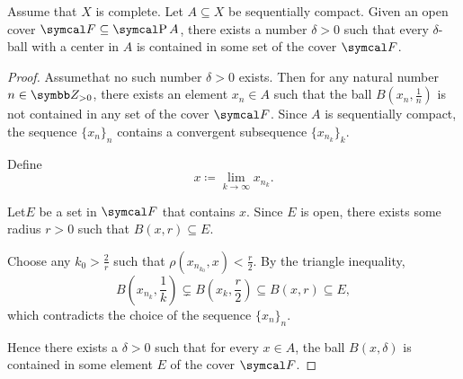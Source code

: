 \begin{lemma}\label{thm:lebesgue_covering_lemma}
  Assume that \( X \) is complete. Let \( A \subseteq X \) be sequentially compact. Given an open cover \( \Cal{F} \subseteq \Power A \), there exists a number \( \delta > 0 \) such that every \( \delta \)-ball with a center in \( A \) is contained in some set of the cover \( \Cal{F} \).
\end{lemma}
\begin{proof}
  Assume\LEM that no such number \( \delta > 0 \) exists. Then for any natural number \( n \in \BZ_{>0} \), there exists an element \( x_n \in A \) such that the ball \( B(x_n, \frac 1 n) \) is not contained in any set of the cover \( \Cal{F} \). Since \( A \) is sequentially compact, the sequence \( \{ x_n \}_n \) contains a convergent subsequence \( \{ x_{n_k} \}_k \).

  Define
  \begin{equation*}
    x \coloneqq \lim_{k \to \infty} x_{n_k}.
  \end{equation*}

  Let\AOC \( E \) be a set in \( \Cal{F} \) that contains \( x \). Since \( E \) is open, there exists some radius \( r > 0 \) such that \( B(x, r) \subseteq E \).

  Choose any \( k_0 > \frac 2 r \) such that \( \rho(x_{n_{k_0}}, x) < \frac r 2 \). By the triangle inequality,
  \begin{equation*}
    B \left(x_{n_k}, \frac 1 k \right) \subsetneq B \left(x_k, \frac r 2 \right) \subseteq B(x, r) \subseteq E,
  \end{equation*}
  which contradicts the choice of the sequence \( \{ x_n \}_n \).

  Hence there exists a \( \delta > 0 \) such that for every \( x \in A \), the ball \( B(x, \delta) \) is contained in some element \( E \) of the cover \( \Cal{F} \).
\end{proof}

